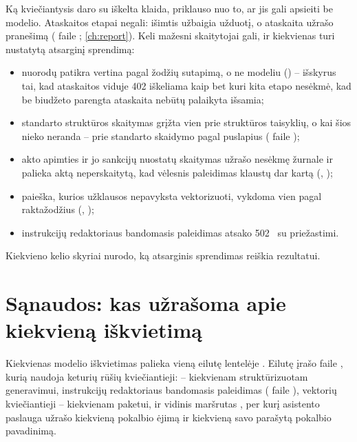 Ką kviečiantysis daro su iškelta klaida, priklauso nuo to, ar jis gali apsieiti be modelio.
Ataskaitos etapai negali: išimtis užbaigia užduotį, o ataskaita užrašo pranešimą
( faile ; \cref{ch:report}). Keli mažesni
skaitytojai gali, ir kiekvienas turi nustatytą atsarginį sprendimą:

\begin{itemize}
  \item nuorodų patikra vertina pagal žodžių sutapimą, o ne modeliu
    () -- išskyrus tai, kad ataskaitos viduje 402 iškeliama kaip bet
    kuri kita etapo nesėkmė, kad be biudžeto parengta ataskaita nebūtų palaikyta išsamia;
  \item standarto struktūros skaitymas grįžta vien prie struktūros taisyklių, o kai šios nieko
    neranda -- prie standarto skaidymo pagal puslapius ( faile
    );
  \item akto apimties ir jo sankcijų nuostatų skaitymas užrašo nesėkmę žurnale ir palieka aktą
    neperskaitytą, kad vėlesnis paleidimas klaustų dar kartą (,
    );
  \item paieška, kurios užklausos nepavyksta vektorizuoti, vykdoma vien pagal raktažodžius
    (, );
  \item instrukcijų redaktoriaus bandomasis paleidimas atsako 502~ su
    priežastimi.
\end{itemize}

Kiekvieno kelio skyriai nurodo, ką atsarginis sprendimas reiškia rezultatui.


\section{Sąnaudos: kas užrašoma apie kiekvieną iškvietimą}\label{sec:models:usage}

Kiekvienas modelio iškvietimas palieka vieną eilutę lentelėje . Eilutę įrašo
 faile , kurią naudoja keturių rūšių
kviečiantieji:  -- kiekvienam struktūrizuotam generavimui, instrukcijų
redaktoriaus bandomasis paleidimas ( faile ),
vektorių kviečiantieji -- kiekvienam paketui, ir vidinis maršrutas
, per kurį asistento paslauga užrašo kiekvieną
pokalbio ėjimą ir kiekvieną savo parašytą pokalbio pavadinimą.


